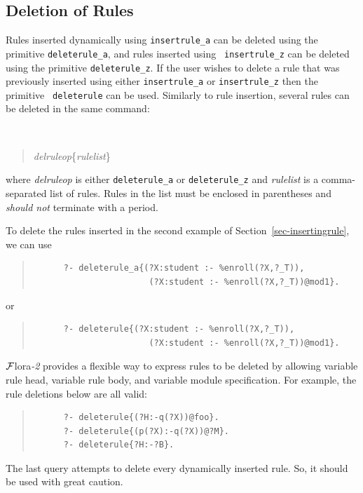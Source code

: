 \documentclass[11pt]{article}
\newcommand{\FLORA}{{\mbox{\sc ${\cal F}${lora}\rm\emph{-2}}}\xspace}
\begin{document}
\subsection{Deletion of Rules}
\label{sec-deletingrule}

Rules inserted dynamically using {\tt insertrule\_a} can be deleted using
the primitive {\tt deleterule\_a}, and rules inserted using {\tt
  insertrule\_z} can be deleted using the primitive {\tt deleterule\_z}. If
the user wishes to delete a rule that was previously inserted using either
{\tt insertrule\_a} or {\tt insertrule\_z} then the primitive {\tt
  deleterule} can be used. Similarly to rule insertion, several rules can be
deleted in the same command:
{\tt
\begin{quote}
\emph{delruleop}\{\emph{rulelist}\}
\end{quote}
}
\noindent
where \emph{delruleop} is either {\tt deleterule\_a} or {\tt deleterule\_z}
and \emph{rulelist} is a comma-separated list of rules. Rules in the list
must be enclosed in parentheses and \emph{should not} terminate with a
period.

To delete the rules inserted in the second example of
Section~\ref{sec-insertingrule}, we can use
\begin{quote}
\begin{verbatim}
      ?- deleterule_a{(?X:student :- %enroll(?X,?_T)),
                       (?X:student :- %enroll(?X,?_T))@mod1}.
\end{verbatim}
\end{quote}
or
\begin{quote}
\begin{verbatim}
      ?- deleterule{(?X:student :- %enroll(?X,?_T)),
                       (?X:student :- %enroll(?X,?_T))@mod1}.
\end{verbatim}
\end{quote}

\FLORA provides a flexible way to express rules to be deleted by
allowing variable rule head, variable rule body, and variable module
specification. For example, the rule deletions below are all valid:
\begin{quote}
\begin{verbatim}
      ?- deleterule{(?H:-q(?X))@foo}.
      ?- deleterule{(p(?X):-q(?X))@?M}.
      ?- deleterule{?H:-?B}.
\end{verbatim}
\end{quote}
The last query attempts to delete every dynamically inserted rule. So, it
should be used with great caution.
\end{document}
